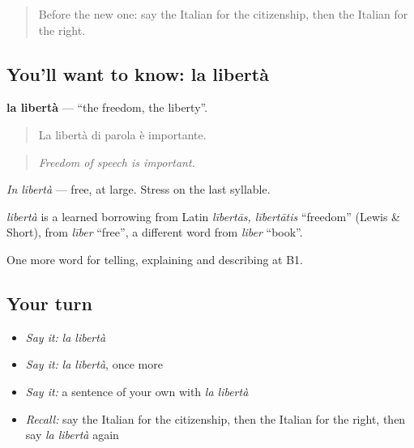 \label{lesson:IT-C363-liberta}



\begin{quote}
Before the new one: say the Italian for the citizenship, then the Italian for the right.
\end{quote}

\subsection*{You'll want to know: la libertà}
\textbf{la libertà} — \textquotedblleft{}the freedom, the liberty\textquotedblright{}.

\begin{quote}
La libertà di parola è importante.
\end{quote}

\begin{quote}
\emph{Freedom of speech is important.}
\end{quote}

\emph{In libertà} — free, at large. Stress on the last syllable.

\begin{cousinweb}
\emph{libertà} is a learned borrowing from Latin \emph{lībertās, lībertātis} \textquotedblleft{}freedom\textquotedblright{} (Lewis \& Short), from \emph{līber} \textquotedblleft{}free\textquotedblright{}, a different word from \emph{liber} \textquotedblleft{}book\textquotedblright{}.
\end{cousinweb}

\begin{grammarlens}[title={What you've built}]
One more word for telling, explaining and describing at B1.
\end{grammarlens}

\subsection*{Your turn}
\begin{itemize}
\raggedright
  \item \emph{Say it:} \emph{la libertà}
  \item \emph{Say it:} \emph{la libertà}, once more
  \item \emph{Say it:} a sentence of your own with \emph{la libertà}
  \item \emph{Recall:} say the Italian for the citizenship, then the Italian for the right, then say \emph{la libertà} again
\end{itemize}

